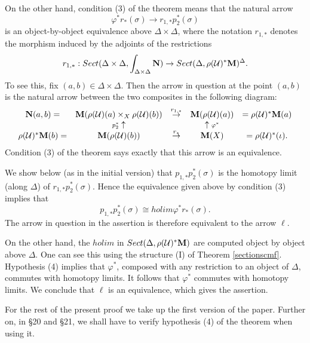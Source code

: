 On the other hand, condition (3) of the theorem means that the
natural arrow
$$
\varphi ^{\ast}r_{\ast} (\sigma ) \rightarrow
r_{1,\ast} p_2^{\ast} (\sigma )
$$
is an object-by-object equivalence above
$\Delta \times \Delta$, where
the notation $r_{1,\ast}$ denotes the morphism induced by
the adjoints of the restrictions
$$
r_{1,\ast} :
Sect (\Delta \times \Delta , \int _{\Delta \times \Delta}{\bf N} )
\rightarrow
Sect (\Delta , \rho ({\cal U} )^{\ast} {\bf M} )^{\Delta}.
$$
To see this, fix $(a,b)\in \Delta \times \Delta$. Then the arrow
in question at the point $(a,b)$ is the natural arrow between the two
composites in the following diagram:
$$
\begin{array}{ccccc}
{\bf N} (a,b) = & {\bf M} (\rho ({\cal U} )(a) \times _X \rho ({\cal U} )(b) )
& \stackrel{r_{1,\ast}}{\rightarrow} & {\bf M} (\rho ({\cal U} )(a)) &
= \rho ({\cal U} )^{\ast} {\bf M} (a) \\
& {\scriptstyle p_2^{\ast}}\uparrow  && \uparrow {\scriptstyle \varphi ^{\ast}}
& \\
\rho ({\cal U} )^{\ast}{\bf M} (b) = & {\bf M} (\rho ({\cal U} )(b)) &
\stackrel{r_{\ast}}{\rightarrow} & {\bf M} (X) & = \rho ({\cal U} )^{\ast}(\iota ).
\end{array}
$$
Condition (3) of the theorem says exactly that this arrow is an
equivalence.


We show below (as in the initial version)
that $p _{1,\ast}p_2^{\ast} (\sigma )$ is the
homotopy limit (along $\Delta$) of
$r_{1,\ast} p_2^{\ast} (\sigma )$. Hence the equivalence given above
by condition (3) implies that
$$
p _{1,\ast}p_2^{\ast} (\sigma )\cong
holim \varphi ^{\ast} r_{\ast} (\sigma ).
$$
The arrow in question in the assertion is therefore equivalent to
the arrow $\ell$.

On the other hand, the $holim$ in
$Sect (\Delta , \rho ({\cal U} )^{\ast} {\bf M} )$ are computed object by object
above $\Delta$. One can see this using the structure (I)
of Theorem \ref{sectionscmf}. Hypothesis (4) implies that
$\varphi ^{\ast}$, composed with any restriction to an object
of $\Delta$, commutes with homotopy limits. It follows that $\varphi ^{\ast}$
commutes
with homotopy limits.
We conclude that $\ell$ is an equivalence, which gives the assertion.


For the rest of the present proof we take up
the first version of the paper. Further on, in
\S 20 and \S 21, we shall have to verify hypothesis
(4) of the theorem when using it.






